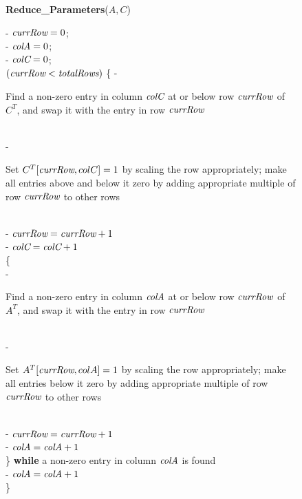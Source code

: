 \begin{figure}[t]
\begin{singlespace}
{
\hspace{16pt}\parbox{4.2in}{
{\bf Reduce\_Parameters}(\mbox{$A, C$})
\begin{algorithmic}
\STATE - $\mbox{\it currRow} = 0$; \\ \vspace{6pt}
\STATE - $\mbox{\it colA} = 0$; \\ \vspace{6pt}
\STATE - $\mbox{\it colC} = 0$; \\ \vspace{6pt}
 $(\mbox{\it currRow} < \mbox{\it totalRows})$ \{
\IND
\STATE - \parbox[t]{5.85in}{Find a non-zero entry in column $\mbox{\it colC}$ at or below row $\mbox{\it currRow}$ of $C^T$, and swap it with the entry in row $\mbox{\it currRow}$} \\ \vspace{6pt}
\STATE - \parbox[t]{5.85in}{Set $C^T[\mbox{\it currRow}, colC] = 1$ by scaling the row appropriately; make all entries above and below it zero by adding appropriate multiple of row $\mbox{\it currRow}$ to other rows} \\ \vspace{6pt}
\STATE - $\mbox{\it currRow} = \mbox{\it currRow} + 1$ \\ \vspace{6pt}
\STATE - $\mbox{\it colC} = \mbox{\it colC} + 1$ \\ \vspace{6pt}
 \{  \\ \vspace{6pt}
\IND
\STATE - \parbox[t]{5.75in}{Find a non-zero entry in column $\mbox{\it colA}$ at or below row $\mbox{\it currRow}$ of $A^T$, and swap it with the entry in row $\mbox{\it currRow}$} \\ \vspace{6pt}
\STATE - \parbox[t]{5.75in}{Set $A^T[\mbox{\it currRow}, colA] = 1$ by scaling the row appropriately; make all entries below it zero by adding appropriate multiple of row $\mbox{\it currRow}$ to other rows} \\ \vspace{6pt}
\STATE - $\mbox{\it currRow} = \mbox{\it currRow} + 1$ \\ \vspace{6pt}
\STATE - $\mbox{\it colA} = \mbox{\it colA} + 1$ \\ \vspace{6pt}
\UND
\STATE \} {\bf while} a non-zero entry in column $\mbox{\it colA}$ is found \\ \vspace{6pt}
\STATE - $\mbox{\it colA} = \mbox{\it colA}+1$ \\ \vspace{6pt}
\UND
\STATE \} \\ \vspace{6pt}
\end{algorithmic}
} %

}
\end{singlespace}
\end{figure}
